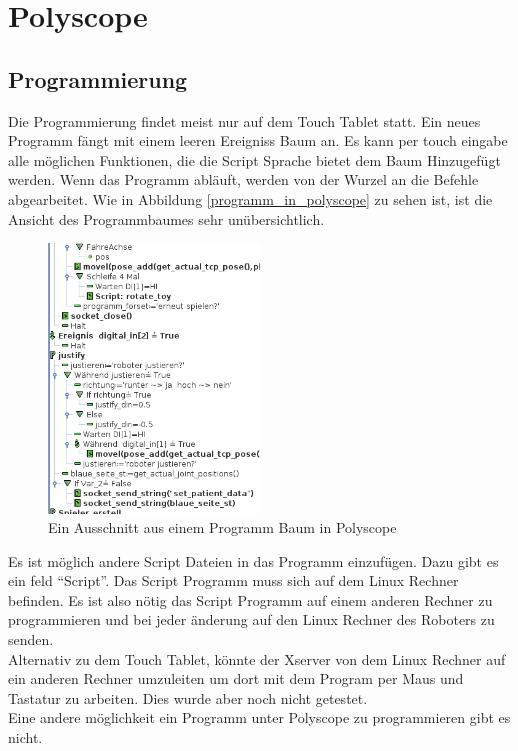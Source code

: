\section{Polyscope}
\label{sec:Polyscope_rel}

\subsection{Programmierung}
\label{programmierung_polyscope_rel}

Die Programmierung findet meist nur auf dem Touch Tablet statt. Ein neues Programm fängt mit einem leeren Ereigniss Baum an. Es kann per touch eingabe alle möglichen Funktionen, die die Script Sprache bietet dem Baum Hinzugefügt werden. Wenn das Programm abläuft, werden von der Wurzel an die Befehle abgearbeitet.
Wie in Abbildung \ref{programm_in_polyscope} zu sehen ist, ist die Ansicht des Programmbaumes sehr unübersichtlich.

\begin{figure}[ht]
  \centering
    \includegraphics[width=0.5\textwidth]{pic/polyscope_program_tree.png}
      \caption[Programm Baum in Polyscope]{Ein Ausschnitt aus einem Programm Baum in Polyscope}
      \label{fig:programm_in_polyscope}
\end{figure}

Es ist möglich andere Script Dateien in das Programm einzufügen. Dazu gibt es ein feld ``Script''. Das Script Programm muss sich auf dem Linux Rechner befinden. Es ist also nötig das Script Programm auf einem anderen Rechner zu programmieren und bei jeder änderung auf den Linux Rechner des Roboters zu senden.
\\
Alternativ zu dem Touch Tablet, könnte der Xserver von dem Linux Rechner auf ein anderen Rechner umzuleiten um dort mit dem Program per Maus und Tastatur zu arbeiten. Dies wurde aber noch nicht getestet.
\\
Eine andere möglichkeit ein Programm unter Polyscope zu programmieren gibt es nicht.

